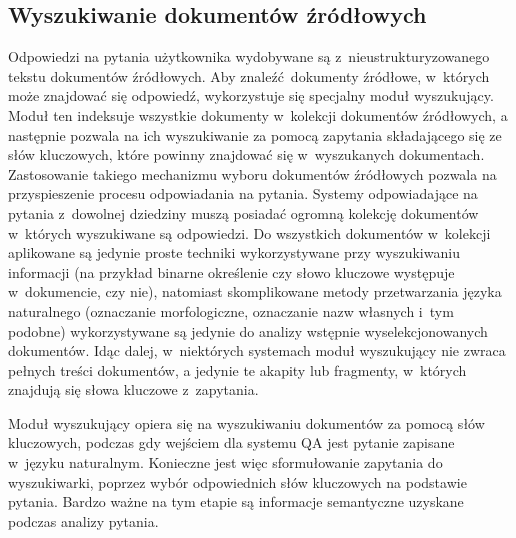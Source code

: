 \documentclass[a4paper, twoside, 12pt]{report}
\begin{document}
        \subsection{Wyszukiwanie dokumentów źródłowych} \label{QUERYGENERATION}
            Odpowiedzi na pytania użytkownika wydobywane są z~nieustrukturyzowanego tekstu dokumentów źródłowych. Aby
            znaleźć dokumenty źródłowe, w~których może znajdować się odpowiedź, wykorzystuje się specjalny moduł
            wyszukujący. Moduł ten indeksuje wszystkie dokumenty w~kolekcji dokumentów źródłowych, a następnie pozwala
            na ich wyszukiwanie za pomocą zapytania składającego się ze słów kluczowych, które powinny znajdować się
            w~wyszukanych dokumentach. Zastosowanie takiego mechanizmu wyboru dokumentów źródłowych pozwala na
            przyspieszenie procesu odpowiadania na pytania\cite{PASSAGERETRIVAL}. Systemy odpowiadające na pytania z~dowolnej dziedziny muszą
            posiadać ogromną kolekcję dokumentów w~których wyszukiwane są odpowiedzi. Do wszystkich dokumentów w~kolekcji
            aplikowane są jedynie proste techniki wykorzystywane przy wyszukiwaniu informacji (na przykład binarne
            określenie czy słowo kluczowe występuje w~dokumencie, czy nie), natomiast skomplikowane metody przetwarzania
            języka naturalnego (oznaczanie morfologiczne, oznaczanie nazw własnych i~tym podobne) wykorzystywane są jedynie
            do analizy wstępnie wyselekcjonowanych dokumentów. Idąc dalej, w~niektórych systemach moduł wyszukujący nie
            zwraca pełnych treści dokumentów, a jedynie te akapity lub fragmenty, w~których znajdują się słowa kluczowe
            z~zapytania.

            Moduł wyszukujący opiera się na wyszukiwaniu dokumentów za pomocą słów kluczowych, podczas gdy wejściem
            dla systemu QA jest pytanie zapisane w~języku naturalnym. Konieczne jest więc sformułowanie zapytania
            do wyszukiwarki, poprzez wybór odpowiednich słów kluczowych na podstawie pytania. Bardzo ważne na tym
            etapie są informacje semantyczne uzyskane podczas analizy pytania.
\end{document}
